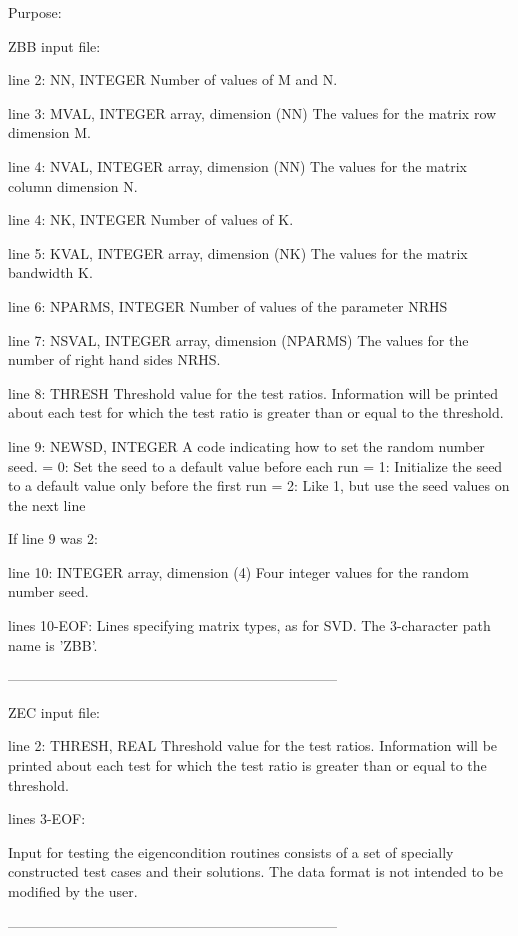 \begin{DoxyParagraph}{Purpose\+: }
\begin{DoxyVerb}
 ZBB input file:

 line 2:  NN, INTEGER
          Number of values of M and N.

 line 3:  MVAL, INTEGER array, dimension (NN)
          The values for the matrix row dimension M.

 line 4:  NVAL, INTEGER array, dimension (NN)
          The values for the matrix column dimension N.

 line 4:  NK, INTEGER
          Number of values of K.

 line 5:  KVAL, INTEGER array, dimension (NK)
          The values for the matrix bandwidth K.

 line 6:  NPARMS, INTEGER
          Number of values of the parameter NRHS

 line 7:  NSVAL, INTEGER array, dimension (NPARMS)
          The values for the number of right hand sides NRHS.

 line 8:  THRESH
          Threshold value for the test ratios.  Information will be
          printed about each test for which the test ratio is greater
          than or equal to the threshold.

 line 9:  NEWSD, INTEGER
          A code indicating how to set the random number seed.
          = 0:  Set the seed to a default value before each run
          = 1:  Initialize the seed to a default value only before the
                first run
          = 2:  Like 1, but use the seed values on the next line

 If line 9 was 2:

 line 10: INTEGER array, dimension (4)
          Four integer values for the random number seed.

 lines 10-EOF:  Lines specifying matrix types, as for SVD.
          The 3-character path name is 'ZBB'.

-----------------------------------------------------------------------

 ZEC input file:

 line  2: THRESH, REAL
          Threshold value for the test ratios.  Information will be
          printed about each test for which the test ratio is greater
          than or equal to the threshold.

 lines  3-EOF:

 Input for testing the eigencondition routines consists of a set of
 specially constructed test cases and their solutions.  The data
 format is not intended to be modified by the user.

-----------------------------------------------------------------------


\end{DoxyVerb}
\end{DoxyParagraph}
